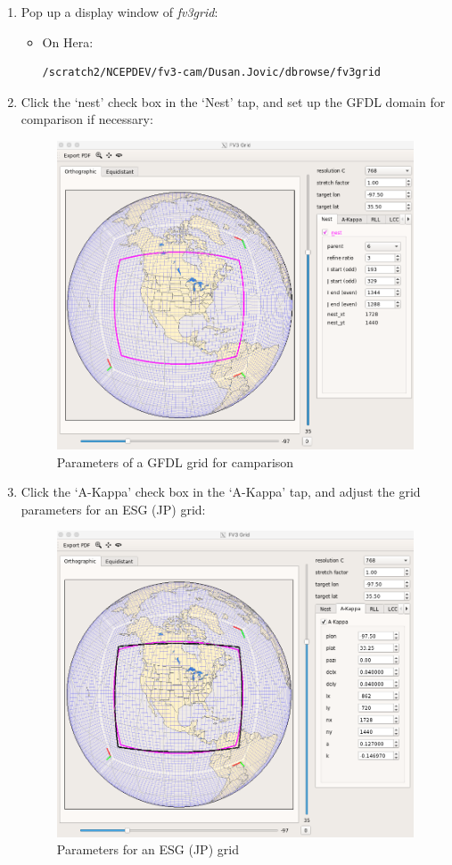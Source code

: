 \documentclass[11pt,fleqn]{report}              %
\begin{document}
\begin{enumerate}

\item Pop up a display window of {\it fv3grid}:

\begin{itemize}
\item On Hera:
\lstset{language=bash}   
\begin{lstlisting}[frame=trBL]
/scratch2/NCEPDEV/fv3-cam/Dusan.Jovic/dbrowse/fv3grid
\end{lstlisting}
\end{itemize}

\item Click the `nest' check box in the `Nest' tap, and set up the GFDL domain for comparison if necessary:
\begin{figure}[ht!]
  \centering
  \includegraphics[width=0.6\linewidth]{post_fv3grid_esg1.png}
  \caption{Parameters of a GFDL grid for camparison }
  \label{fig:post_fv3grid_esg1}
\end{figure}

\item Click the `A-Kappa' check box in the `A-Kappa' tap, and adjust the grid parameters for an ESG (JP) grid:
\begin{figure}[ht!]
  \centering
  \includegraphics[width=0.6\linewidth]{post_fv3grid_esg2.png}
  \caption{Parameters for an ESG (JP) grid}
  \label{fig:post_fv3grid_esg2}
\end{figure}

\end{enumerate}
\end{document}
